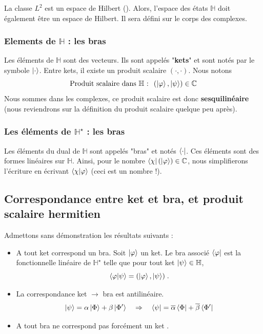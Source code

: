 \documentclass[../notesdecours.tex]{subfiles}
\begin{document}
La classe $L^2$ est un espace de Hilbert ({\color{red}{démonstration? exercice?}}). Alors, l'espace des états $\mathbb{H}$ doit également être un espace de Hilbert. Il sera défini sur le corps des complexes. 
\subsubsection{Elements de $\mathbb{H}$ : les bras}
Les éléments de $\mathbb{H}$ sont des vecteurs. Ils sont appelés "\textbf{kets}" et sont notés par le symbole $\ket \cdot$. Entre kets, il existe un produit scalaire $(\cdot, \cdot)$. Nous notons $$\text{Produit scalaire dans $\mathbb{H}$ : }\;  (\ket \varphi , \ket \psi ) \in \mathbb{C}$$
Nous sommes dans les complexes, ce produit scalaire est donc \textbf{sesquilinéaire} (nous reviendrons sur la définition du produit scalaire quelque peu après).

\subsubsection{Les éléments de $\mathbb{H}^\star$ : les bras}
Les éléments du dual de $\mathbb{H}$ sont appelés "bras" et notés $\bra \cdot$. Ces éléments sont des formes linéaires sur $\mathbb{H}$. Ainsi, pour le nombre $\bra \chi (\ket \varphi) \in \mathbb{C}$, nous simplifierons l'écriture en écrivant $\braket{\chi | \varphi}$ (ceci est un nombre !).

\subsection{Correspondance entre ket et bra, et produit scalaire hermitien}
Admettons sans démonstration les résultats suivants :
\begin{itemize}
	\item A tout ket correspond un bra. Soit $\ket \varphi$ un ket. Le bra associé $\bra \varphi$ est la fonctionnelle linéaire de $\mathbb{H}^\star$ telle que pour tout ket $\ket \psi \in \mathbb{H}$, $$\braket{\varphi | \psi}= (\ket \varphi, \ket \psi) \; .$$
	
	\item La correspondance ket $\rightarrow$ bra est antilinéaire. $$\ket{\psi} = \alpha \ket{\Phi} + \beta\ket{\Phi'} \quad \Rightarrow \quad \bra{\psi} = \overline{\alpha}\bra{\Phi}+\overline{\beta}\bra{\Phi'}$$  
	\item A tout bra ne correspond pas forcément un ket {\color{red}{j'ajouterais une explication -- je n'ai pas encore lu celle du Cohen}}.
\end{itemize}
\end{document}
